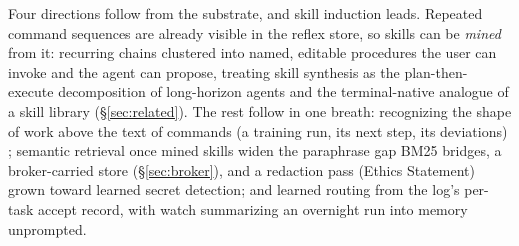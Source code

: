 Four directions follow from the substrate, and skill induction leads. Repeated
command sequences are already visible in the reflex store, so skills can be
\emph{mined} from it: recurring  chains clustered into named,
editable procedures the user can invoke and the agent can propose, treating skill
synthesis as the plan-then-execute decomposition of long-horizon agents
\citep{erdogan2025planandact} and the terminal-native analogue of a skill library
(\S\ref{sec:related}). The rest follow in one breath: recognizing the shape of work
above the text of commands (a training run, its next step, its deviations)
\citep{wu2025osatlas}; semantic retrieval once mined skills widen the paraphrase gap
BM25 bridges, a broker-carried store (\S\ref{sec:broker}), and a redaction pass
(Ethics Statement) grown toward learned secret detection; and learned routing from the
log's per-task accept record, with watch summarizing an overnight run into memory
unprompted.
